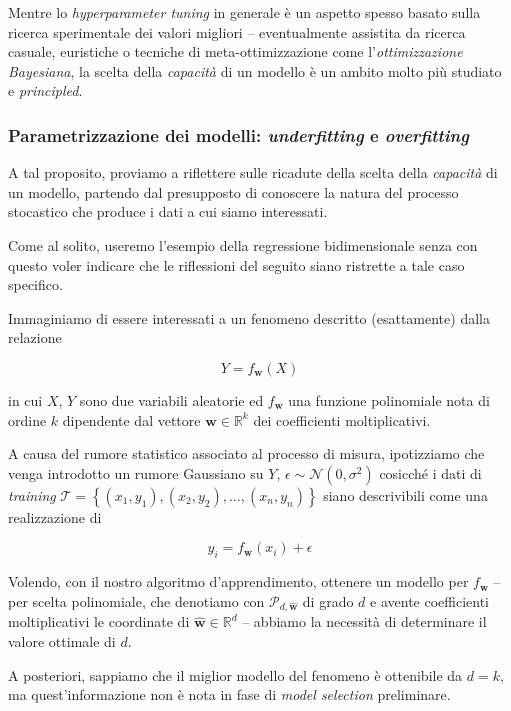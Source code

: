 \documentclass[a4paper, twoside]{article}
\begin{document}
Mentre lo \textit{hyperparameter tuning} in generale è un aspetto spesso basato sulla ricerca sperimentale dei valori migliori -- eventualmente assistita da ricerca casuale, euristiche o tecniche di meta-ottimizzazione come l'\textit{ottimizzazione Bayesiana}, la scelta della \textit{capacità} di un modello è un ambito molto più studiato e \textit{principled}.

\subsubsection{Parametrizzazione dei modelli: \textit{underfitting} e \textit{overfitting}}

A tal proposito, proviamo a riflettere sulle ricadute della scelta della \textit{capacità} di un modello, partendo dal presupposto di conoscere la natura del processo stocastico che produce i dati a cui siamo interessati.

Come al solito, useremo l'esempio della regressione bidimensionale senza con questo voler indicare che le riflessioni del seguito siano ristrette a tale caso specifico.

Immaginiamo di essere interessati a un fenomeno descritto (esattamente) dalla relazione

$$
Y = f_{\boldsymbol{w}}(X)
$$

in cui $X$, $Y$ sono due variabili aleatorie ed $f_{\boldsymbol{w}}$ una funzione polinomiale nota di ordine $k$ dipendente dal vettore $\boldsymbol{w} \in \mathbb{R}^k$ dei coefficienti moltiplicativi.

A causa del rumore statistico associato al processo di misura, ipotizziamo che venga introdotto un rumore Gaussiano su $Y$, $\epsilon \sim \mathcal{N}(0, \sigma^2)$ cosicché i dati di \textit{training} $\mathcal{T} = \left\{(x_1, y_1), (x_2, y_2), \dots,(x_n, y_n) \right\}$ siano descrivibili come una realizzazione di

$$
y_i = f_{\boldsymbol{w}}(x_i) + \epsilon
$$

Volendo, con il nostro algoritmo d'apprendimento, ottenere un modello per $f_{\boldsymbol{w}}$ -- per scelta polinomiale, che denotiamo con $\mathcal{P}_{d, \boldsymbol{\hat{w}}}$ di grado $d$ e avente coefficienti moltiplicativi le coordinate di $\boldsymbol{\hat{w}} \in \mathbb{R}^d$ -- abbiamo la necessità di determinare il valore ottimale di $d$.

A posteriori, sappiamo che il miglior modello del fenomeno è ottenibile da $d = k$, ma quest'informazione non è nota in fase di \textit{model selection} preliminare.
\end{document}
